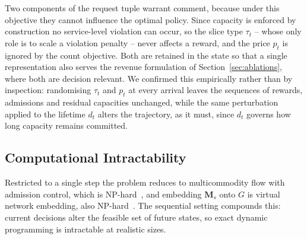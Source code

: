 \documentclass[10pt,journal,comsoc]{IEEEtran}
\begin{document}
Two components of the request tuple warrant comment, because under this
objective they cannot influence the optimal policy. Since capacity is
enforced by construction no service-level violation can occur, so the
slice type $\tau_t$ -- whose only role is to scale a violation penalty --
never affects a reward, and the price $p_t$ is ignored by the count
objective. Both are retained in the state so that a single representation
also serves the revenue formulation of Section~\ref{sec:ablations}, where
both are decision relevant. We confirmed this empirically rather than by
inspection: randomising $\tau_t$ and $p_t$ at every arrival leaves the
sequences of rewards, admissions and residual capacities unchanged, while
the same perturbation applied to the lifetime $d_t$ alters the trajectory,
as it must, since $d_t$ governs how long capacity remains committed.

\subsection{Computational Intractability}
Restricted to a single step the problem reduces to multicommodity flow
with admission control, which is NP-hard~\cite{hall2007multicommodity},
and embedding $\mathbf{M}_s$ onto $G$ is virtual network embedding, also
NP-hard~\cite{rost2020hardness}. The sequential setting compounds this:
current decisions alter the feasible set of future states, so exact
dynamic programming is intractable at realistic sizes.
\end{document}
